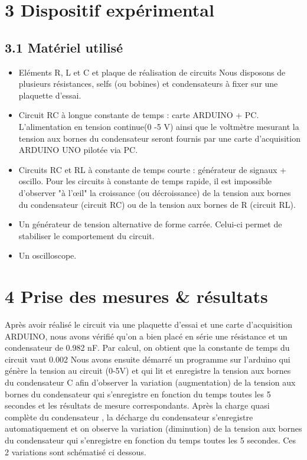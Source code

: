 \documentclass{report}
\begin{document}
\section*{3 Dispositif exp\'erimental}
\subsection*{3.1 Mat\'eriel utilis\'e}
\begin{itemize}
\item Eléments R, L et C et plaque de réalisation de circuits 
Nous disposons de  plusieurs  résistances, selfs (ou  bobines) et condensateurs à fixer sur une plaquette d'essai. 

\item Circuit RC  à longue constante de temps : carte ARDUINO + PC. L’alimentation en tension  continue(0 -5  V)  ainsi  que  le voltmètre mesurant la  tension  aux bornes du condensateur seront fournis par une carte d’acquisition ARDUINO UNO pilotée via PC.  

\item Circuits RC et RL à constante de temps courte : générateur de signaux + oscillo. Pour  les  circuits  à  constante  de  temps  rapide,  il  est  impossible  d'observer "à l'œil" la croissance  (ou  décroissance)  de  la tension  aux  bornes  du  condensateur (circuit  RC)  ou  de  la tension  aux bornes de  R  (circuit  RL).

\item Un g\'en\'erateur de tension alternative de forme carr\'ee. Celui-ci permet de stabiliser le comportement du circuit.

\item Un oscilloscope.
\end{itemize}

\section*{4 Prise des mesures \& r\'esultats}
Après avoir réalisé le  circuit via  une  plaquette  d'essai  et  une  carte d'acquisition ARDUINO, nous avons vérifié qu'on  a  bien  placé en série une  résistance  et  un  condensateur de 0.982 nF.
Par calcul, on obtient que la constante de temps du circuit  vaut 0.002
Nous avons ensuite démarré un programme sur l'arduino qui génère la tension au circuit (0-5V) et qui lit et enregistre la tension aux bornes du condensateur C
afin d'observer la variation (augmentation) de  la  tension  aux  bornes  du condensateur  qui s'enregistre  en  fonction  du  temps  toutes les  5  secondes et  les  résultats  de  mesure correspondants.
Après la charge quasi complète du condensateur , la décharge du condensateur s'enregistre automatiquement  et on observe la variation  (diminution)  de  la tension  aux  bornes  du  condensateur  qui s'enregistre en fonction du temps toutes les 5 secondes.
Ces 2 variations sont schématisé ci dessous.
\end{document}
